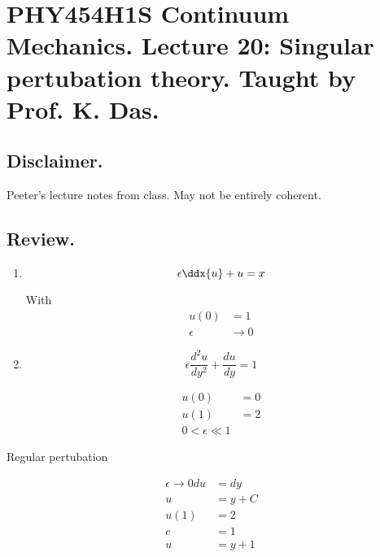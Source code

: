
%

\chapter{PHY454H1S Continuum Mechanics.  Lecture 20: Singular pertubation theory.  Taught by Prof. K. Das.}
\label{chap:continuumL20}
{}
\date{Mar 28, 2012}

\beginArtWithToc

\section{Disclaimer.}

Peeter's lecture notes from class.  May not be entirely coherent.

\section{Review.}

\begin{enumerate}
\item 
\begin{equation}\label{eqn:continuumL20:10}
\epsilon \ddx{u} + u = x
\end{equation}

With 
\begin{align*}
u(0) &= 1 \\
\epsilon &\rightarrow 0
\end{align*}
\item
\begin{equation}\label{eqn:continuumL20:30}
\epsilon \frac{d^2u}{dy^2} + \frac{du}{dy} = 1
\end{equation}

\begin{align*}
u(0) &= 0 \\
u(1) &= 2 \\
0 < \epsilon \ll 1
\end{align*}
\end{enumerate}

Regular pertubation 

\begin{align*}
\epsilon \rightarrow 0
du &= dy \\
u &= y + C \\
u(1) &= 2 \\
c &= 1 \\
u &= y + 1
\end{align*}

